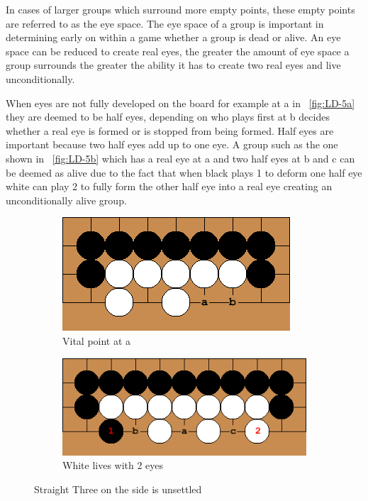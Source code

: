\documentclass{l4proj}
\begin{document}
In cases of larger groups which surround more empty points, these empty points are referred to as the eye space. The eye space of a group is important in determining early on within a game whether a group is dead or alive. An eye space can be reduced to create real eyes, the greater the amount of eye space a group surrounds the greater the ability it has to create two real eyes and live unconditionally.

When eyes are not fully developed on the board for example at a in ~\autoref{fig:LD-5a} they are deemed to be half eyes, depending on who plays first at b decides whether a real eye is formed or is stopped from being formed. Half eyes are important because two half eyes add up to one eye.  A group such as the one shown in ~\autoref{fig:LD-5b} which has a real eye at a and two half eyes at b and c can be deemed as alive due to the fact that when black plays 1 to deform one half eye white can play 2 to fully form the other half eye into a real eye creating an unconditionally alive group.
\begin{figure}[!ht]
\centering
\begin{subfigure}[b]{0.4\textwidth}
\includegraphics[width=\textwidth]{LD/5a.png}
\caption{Vital point at a}
\label{fig:LD-5a}
\end{subfigure}\qquad
\begin{subfigure}[b]{0.5\textwidth}
\includegraphics[width=\textwidth]{LD/5b.png}
\caption{White lives with 2 eyes}
\label{fig:LD-5b}
\end{subfigure}
\caption{Straight Three on the side is unsettled}
\label{fig:LD-5}
\end{figure}
\end{document}
